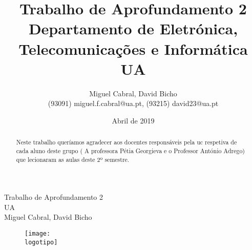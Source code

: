 \documentclass{report}
\begin{document}
%
\def\titulo{Trabalho de Aprofundamento 2}
\def\data{Abril de 2019}
\def\autores{Miguel Cabral, David Bicho}
\def\autorescontactos{(93091) miguel.f.cabral@ua.pt, (93215) david23@ua.pt}
\def\versao{VERSAO}
\def\departamento{Departamento de Eletrónica, Telecomunicações e Informática}
\def\empresa{UA}
\def\logotipo{ua.pdf}
%
%
\begin{titlepage}

\begin{center}
%
\vspace*{50mm}
%
{\Huge \titulo}\\ 
%
\vspace{10mm}
%
{\Large \empresa}\\
%
\vspace{10mm}
%
{\LARGE \autores}\\ 
%
\vspace{30mm}
%
\begin{figure}[h]
\center
\texttt{[image: \\logotipo]}
\end{figure}
%
\vspace{30mm}
\end{center}
%
\begin{flushright}
\end{flushright}
\end{titlepage}

\title{%
{\Huge\textbf{\titulo}}\\
{\Large \departamento\\ \empresa}
}
%
\author{%
    \autores \\
    \autorescontactos
}
%
\date{\data}
%
\maketitle


\renewcommand{\abstractname}{Agradecimentos}
\begin{abstract}
Neste trabalho queríamos agradecer aos docentes responsáveis pela \ac{uc} respetiva de cada aluno deste grupo ( A professora Pétia Georgieva e o Professor António Adrego) que lecionaram as aulas deste 2º semestre.
\end{abstract}


\tableofcontents
\end{document}
